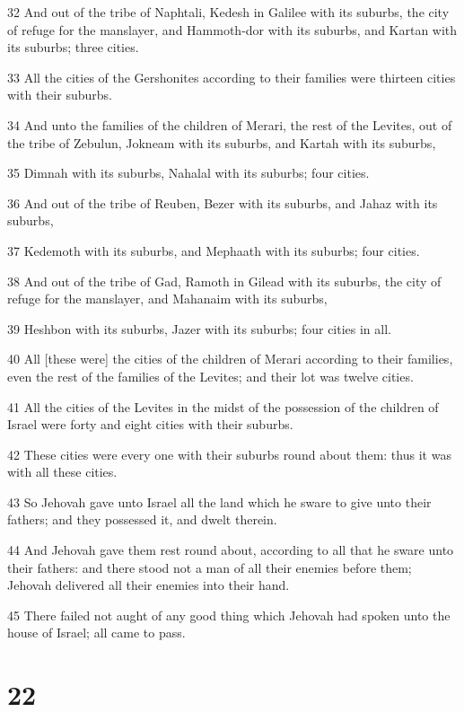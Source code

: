 \par 32 And out of the tribe of Naphtali, Kedesh in Galilee with its suburbs, the city of refuge for the manslayer, and Hammoth-dor with its suburbs, and Kartan with its suburbs; three cities.
\par 33 All the cities of the Gershonites according to their families were thirteen cities with their suburbs.
\par 34 And unto the families of the children of Merari, the rest of the Levites, out of the tribe of Zebulun, Jokneam with its suburbs, and Kartah with its suburbs,
\par 35 Dimnah with its suburbs, Nahalal with its suburbs; four cities.
\par 36 And out of the tribe of Reuben, Bezer with its suburbs, and Jahaz with its suburbs,
\par 37 Kedemoth with its suburbs, and Mephaath with its suburbs; four cities.
\par 38 And out of the tribe of Gad, Ramoth in Gilead with its suburbs, the city of refuge for the manslayer, and Mahanaim with its suburbs,
\par 39 Heshbon with its suburbs, Jazer with its suburbs; four cities in all.
\par 40 All [these were] the cities of the children of Merari according to their families, even the rest of the families of the Levites; and their lot was twelve cities.
\par 41 All the cities of the Levites in the midst of the possession of the children of Israel were forty and eight cities with their suburbs.
\par 42 These cities were every one with their suburbs round about them: thus it was with all these cities.
\par 43 So Jehovah gave unto Israel all the land which he sware to give unto their fathers; and they possessed it, and dwelt therein.
\par 44 And Jehovah gave them rest round about, according to all that he sware unto their fathers: and there stood not a man of all their enemies before them; Jehovah delivered all their enemies into their hand.
\par 45 There failed not aught of any good thing which Jehovah had spoken unto the house of Israel; all came to pass.

\chapter{22}

